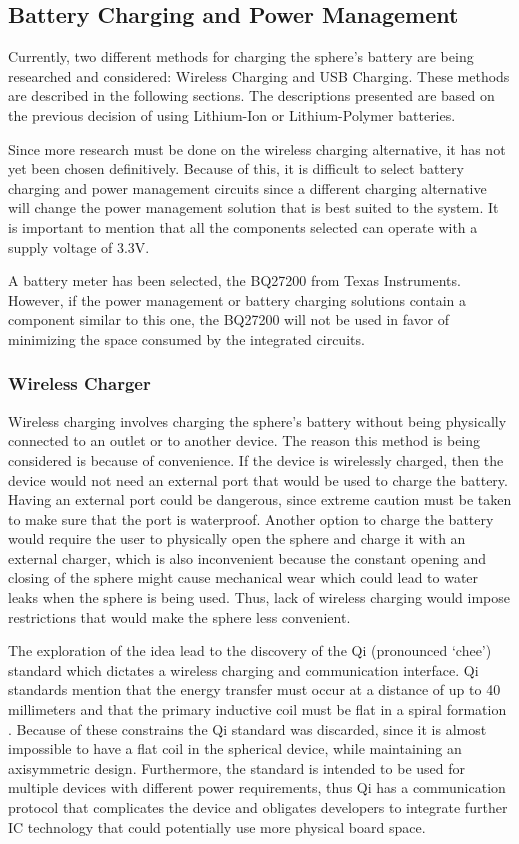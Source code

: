 \subsection{Battery Charging and Power Management}
\label{sec:chargingMethods}
Currently, two different methods for charging the sphere's battery are being researched and considered: Wireless Charging and USB Charging.  These methods are described in the following sections.  The descriptions presented are based on the previous decision of using Lithium-Ion or Lithium-Polymer batteries.

Since more research must be done on the wireless charging alternative, it has not yet been chosen definitively.  Because of this, it is difficult to select battery charging and power management circuits since a different charging alternative will change the power management solution that is best suited to the system.  It is important to mention that all the components selected can operate with a supply voltage of 3.3V.

A battery meter has been selected, the BQ27200 from Texas Instruments.  However, if the power management or battery charging solutions contain a component similar to this one, the BQ27200 will not be used in favor of minimizing the space consumed by the integrated circuits.

\subsubsection{Wireless Charger}
Wireless charging involves charging the sphere's battery without being physically connected to an outlet or to another device. The reason this method is being considered is because of convenience. If the device is wirelessly charged, then the device would not need an external port that would be used to charge the battery. Having an external port could be dangerous, since extreme caution must be taken to make sure that the port is waterproof. Another option to charge the battery would require the user to physically open the sphere and charge it with an external charger, which is also inconvenient because the constant opening and closing of the sphere might cause mechanical wear which could lead to water leaks when the sphere is being used. Thus, lack of wireless charging would impose restrictions that would make the sphere less convenient.

The exploration of the idea lead to the discovery of the Qi (pronounced `chee') standard which dictates a wireless charging and communication interface. Qi standards mention that the energy transfer must occur at a distance of up to 40 millimeters and that the primary inductive coil must be flat in a spiral formation \cite{QiStandard}. Because of these constrains the Qi standard was discarded, since it is almost impossible to have a flat coil in the spherical device, while maintaining an axisymmetric design. Furthermore, the standard is intended to be used for multiple devices with different power requirements, thus Qi has a communication protocol that complicates the device and obligates developers to integrate further IC technology that could potentially use more physical board space. 

